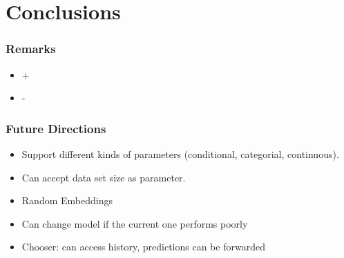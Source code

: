 \documentclass[10pt,handout]{beamer}
\begin{document}
\section{Conclusions}


\begin{frame}
\frametitle{Remarks}

\begin{itemize}[<+->]
	\item +
	\item -

\end{itemize}


\end{frame}


\begin{frame}
\frametitle{Future Directions}

\begin{itemize}
\item Support different kinds of parameters (conditional, categorial, continuous).
\item Can accept data set size as parameter.
\item Random Embeddings
\item Can change model if the current one performs poorly
\item Chooser: can access history, predictions can be forwarded
\end{itemize}

\end{frame}


%

%
\end{document}
